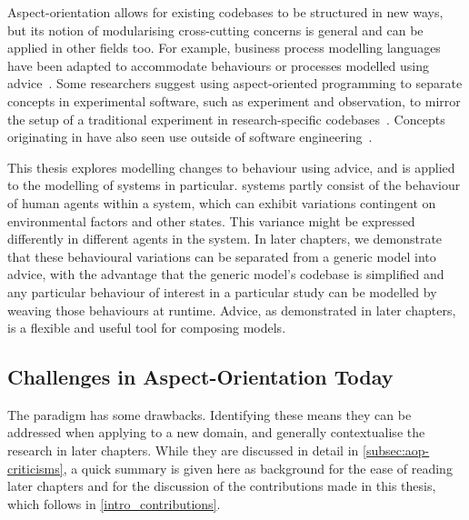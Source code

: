 Aspect-orientation allows for existing codebases to be structured in new ways,
but its notion of modularising cross-cutting concerns is general and can be
applied in other fields too. For example, business process modelling languages
have been adapted to accommodate behaviours or processes modelled using
advice~\cite{Cappelli_AOBPM,da2020implementation,charfi2007ao4bpel}. Some
researchers suggest using aspect-oriented programming to separate concepts in
experimental software, such as experiment and observation, to mirror the setup
of a traditional experiment in research-specific codebases~\cite{gulyas1999use}.
Concepts originating in \aop{} have also seen use outside of software
engineering~\cite{Cieslak_2011,Cappelli_AOBPM,da2020implementation,charfi2007ao4bpel}.

This thesis explores modelling changes to behaviour using advice, and is applied
to the modelling of \sociotechnical systems in particular. \Sociotechnical
systems partly consist of the behaviour of human agents within a system, which
can exhibit variations contingent on environmental factors and other states.
This variance might be expressed differently in different agents in the system.
In later chapters, we demonstrate that these behavioural variations can be
separated from a generic model into advice, with the advantage that the generic
model's codebase is simplified and any particular behaviour of interest in a
particular study can be modelled by weaving those behaviours at runtime. Advice,
as demonstrated in later chapters, is a flexible and useful tool for composing
models.


\subsection{Challenges in Aspect-Orientation Today}

The \aspectoriented{} paradigm has some drawbacks. Identifying these means they
can be addressed when applying \aop{} to a new domain, and generally
contextualise the research in later chapters. While they are discussed in detail
in \cref{subsec:aop-criticisms}, a quick summary is given here as background for
the ease of reading later chapters and for the discussion of the contributions
made in this thesis, which follows in \cref{intro_contributions}.

